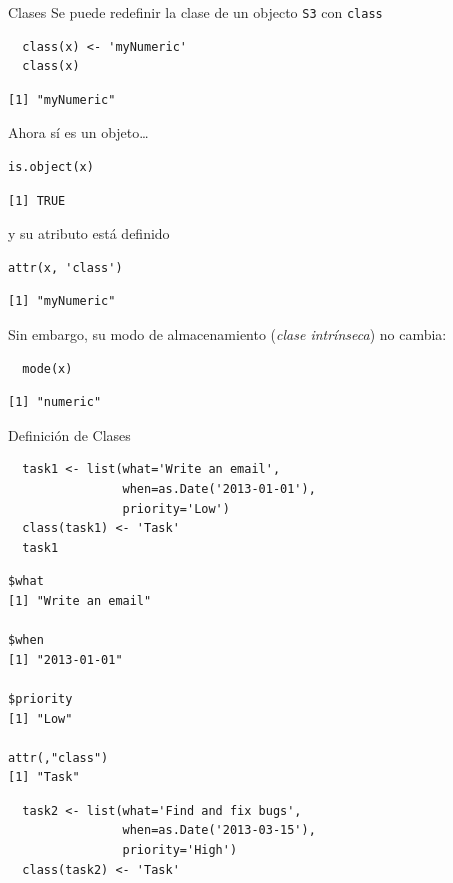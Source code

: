 \documentclass[xcolor={usenames,svgnames,dvipsnames}]{beamer}
\begin{document}
\begin{frame}[label={sec:orgd6e7369},fragile]{Clases}
 Se puede redefinir la clase de un objecto \texttt{S3} con \texttt{class}
\lstset{language=r,label= ,caption= ,captionpos=b,numbers=none}
\begin{lstlisting}
  class(x) <- 'myNumeric'
  class(x)
\end{lstlisting}

\begin{verbatim}
[1] "myNumeric"
\end{verbatim}


Ahora sí es un objeto\ldots{} 
\lstset{language=r,label= ,caption= ,captionpos=b,numbers=none}
\begin{lstlisting}
is.object(x)
\end{lstlisting}

\begin{verbatim}
[1] TRUE
\end{verbatim}


y su atributo está definido
\lstset{language=r,label= ,caption= ,captionpos=b,numbers=none}
\begin{lstlisting}
attr(x, 'class')
\end{lstlisting}

\begin{verbatim}
[1] "myNumeric"
\end{verbatim}


Sin embargo, su modo de almacenamiento (\emph{clase intrínseca}) no cambia:
\lstset{language=r,label= ,caption= ,captionpos=b,numbers=none}
\begin{lstlisting}
  mode(x)
\end{lstlisting}

\begin{verbatim}
[1] "numeric"
\end{verbatim}
\end{frame}

\begin{frame}[label={sec:org4d90674},fragile]{Definición de Clases}
 \lstset{language=r,label= ,caption= ,captionpos=b,numbers=none}
\begin{lstlisting}
  task1 <- list(what='Write an email',
                when=as.Date('2013-01-01'),
                priority='Low')
  class(task1) <- 'Task'
  task1
\end{lstlisting}

\begin{verbatim}
$what
[1] "Write an email"

$when
[1] "2013-01-01"

$priority
[1] "Low"

attr(,"class")
[1] "Task"
\end{verbatim}

\lstset{language=r,label= ,caption= ,captionpos=b,numbers=none}
\begin{lstlisting}
  task2 <- list(what='Find and fix bugs',
                when=as.Date('2013-03-15'),
                priority='High')
  class(task2) <- 'Task'
\end{lstlisting}
\end{frame}
\end{document}
